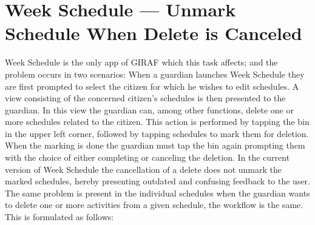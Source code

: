 \section{Week Schedule --- Unmark Schedule When Delete is Canceled}
Week Schedule is the only app of GIRAF which this task affects; and the problem occurs in two scenarios:
When a guardian launches Week Schedule they are first prompted to select the citizen for which he wishes to edit schedules.
A view consisting of the concerned citizen's schedules is then presented to the guardian.
In this view the guardian can, among other functions, delete one or more schedules related to the citizen.
This action is performed by tapping the bin in the upper left corner, followed by tapping schedules to mark them for deletion.
When the marking is done the guardian must tap the bin again prompting them with the choice of either completing or canceling the deletion.
In the current version of Week Schedule the cancellation of a delete does not unmark the marked schedules, hereby presenting outdated and confusing feedback to the user.
The same problem is present in the individual schedules when the guardian wants to delete one or more activities from a given schedule, the workflow is the same.
This is formulated as follows:
\begin{center}
\end{center}


